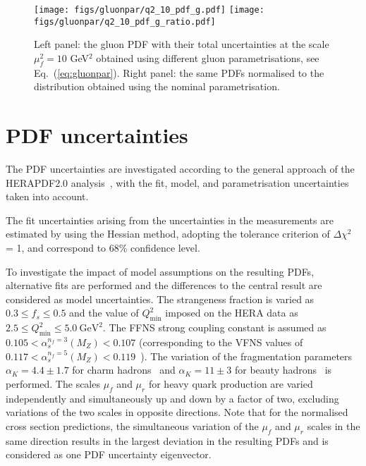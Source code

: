 \begin{figure}
    \centering
    \texttt{[image: figs/gluonpar/q2\_10\_pdf\_g.pdf]}
    \texttt{[image: figs/gluonpar/q2\_10\_pdf\_g\_ratio.pdf]}
    \caption{Left panel: the gluon PDF with their total uncertainties at the scale $\mu^2_f=10$ GeV$^2$ obtained using different gluon parametrisations, see Eq.~(\ref{eq:gluonpar}). Right panel: the same PDFs normalised to the distribution obtained using the nominal parametrisation.}
    \label{fig:gluonpar}
\end{figure}

\section{PDF uncertainties}
\label{sec:pdfunc}

The PDF uncertainties are investigated according to the general approach of the HERAPDF2.0 analysis~\cite{Abramowicz:2015mha}, with the fit, model, and parametrisation uncertainties taken into account.

The fit uncertainties arising from the uncertainties in the measurements are estimated by using the Hessian method, adopting the tolerance criterion of $\Delta \chi^2$ = 1, and correspond to 68\% confidence level.

To investigate the impact of model assumptions on the resulting PDFs, alternative fits are performed and the differences to the central result are considered as model uncertainties. The strangeness fraction is varied as $0.3 \leq f_{s} \leq 0.5$ and the value of $Q^2_{\text{min}}$ imposed on the HERA data as $2.5 \leq Q^2_\textrm{min}\leq 5.0~\textrm{GeV}^2$. The FFNS strong coupling constant is assumed as $0.105 < \alpha_s^{n_f=3}(M_Z) < 0.107$ (corresponding to the VFNS values of $0.117 < \alpha_s^{n_f=5}(M_Z) < 0.119$~\cite{Tanabashi:2018oca}). The variation of the fragmentation parameters $\alpha_K = 4.4 \pm 1.7$ for charm hadrons~\cite{Aaron:2008ac,Chekanov:2008ur} and $\alpha_K = 11 \pm 3$ for beauty hadrons~\cite{Nason:1999zj} is performed.
The scales $\mu_f$ and $\mu_r$ for heavy quark production are varied independently and simultaneously up and down by a factor of two, excluding variations of the two scales in opposite directions. Note that for 
the normalised cross section predictions, the simultaneous variation of the $\mu_f$ and $\mu_r$ scales in the same direction results in the largest deviation in the 
resulting PDFs and is considered as one PDF uncertainty eigenvector.

